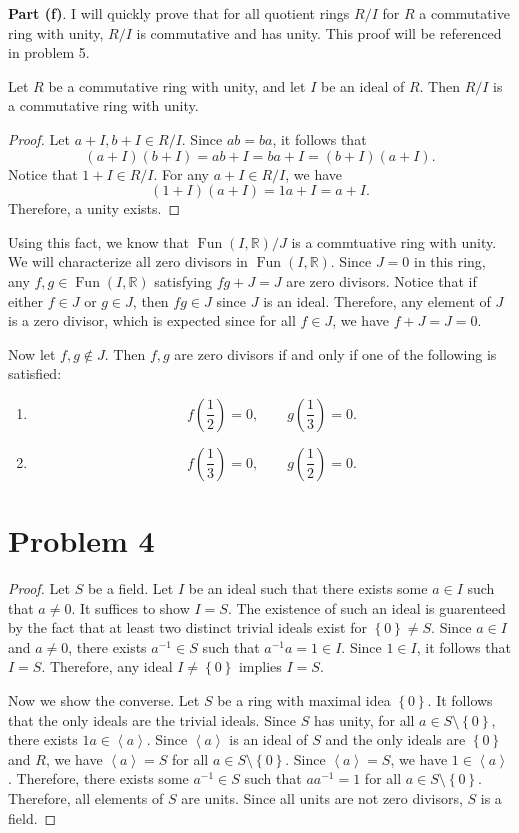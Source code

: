\documentclass[11pt, letterpaper]{report}
\begin{document}
\noindent \textbf{Part (f)}. I will quickly prove that for all quotient rings $R /I$ for $R$ a commutative ring with unity, $R /I$ is commutative and has unity. This proof will be referenced in problem 5.
\begin{proposition}\label{1}
	Let $R$ be a commutative ring with unity, and let $I$ be an ideal of $R$. Then $R /I$ is a commutative ring with unity.
\end{proposition}
\begin{proof}
	Let $a+I,b+I\in R /I$. Since $ab=ba$, it follows that
	\[
		\left( a+I \right) \left( b+I \right) =ab+I=ba+I=\left( b+I \right) \left( a+I \right) 
	.\]
	Notice that $1+I\in R /I$. For any $a+I\in R/I$, we have
	\[
		\left( 1+I \right) \left( a+I \right) =1a+I=a+I
	.\]
	Therefore, a unity exists.
\end{proof}
Using this fact, we know that $\operatorname{Fun}(I,\mathbb{R})  /J$ is a commtuative ring with unity. We will characterize all zero divisors in $\operatorname{Fun}(I,\mathbb{R}) $. Since $J=0$ in this ring, any $f,g\in \operatorname{Fun}(I,\mathbb{R}) $ satisfying $fg+ J=J$ are zero divisors. Notice that if  either $f\in J$ or $g\in J$, then $fg\in J$ since $J$ is an ideal. Therefore, any element of $J$ is a zero divisor, which is expected since for all $f\in J$, we have $f+J=J=0$.

Now let $f,g\notin J$. Then $f,g$ are zero divisors if and only if one of the following is satisfied:
\begin{enumerate}
	\item
		\[
			f\left( \frac{1}{2} \right) =0,\qquad g\left( \frac{1}{3} \right) =0
		.\]
	\item 
		\[
			f\left( \frac{1}{3} \right) =0,\qquad g\left( \frac{1}{2} \right) =0
		.\]
\end{enumerate}
\section*{Problem 4}
\begin{proof}
Let $S$ be a field. Let $I$ be an ideal such that there exists some $a\in I$ such that $a\neq 0$. It suffices to show $I=S$. The existence of such an ideal is guarenteed by the fact that at least two distinct trivial ideals exist for $\left\{ 0 \right\} \neq S$. Since $a\in I$ and $a\neq 0$, there exists $a^{-1}\in S$ such that $a^{-1}a=1\in I$. Since $1\in I$, it follows that $I=S$. Therefore, any ideal $I\neq \left\{ 0 \right\} $ implies $I=S$.

Now we show the converse. Let $S$ be a ring with  maximal idea $\left\{ 0 \right\} $. It follows that the only ideals are the trivial ideals. Since $S$ has unity, for all $a\in S\setminus\left\{ 0 \right\} $, there exists $1a\in \left\langle a \right\rangle $. Since $\left\langle a \right\rangle $ is an ideal of $S$ and the only ideals are $\left\{ 0 \right\} $ and $R$, we have $\left\langle a \right\rangle =S$ for all $a\in S\setminus\left\{ 0 \right\} $. Since $\left\langle a \right\rangle =S$, we have $1\in \left\langle a \right\rangle $. Therefore, there exists some $a^{-1}\in S$ such that $aa^{-1}=1$ for all $a\in S\setminus\left\{ 0 \right\} $. Therefore, all elements of $S$ are units. Since all units are not zero divisors, $S$ is a field.
\end{proof}
\end{document}
